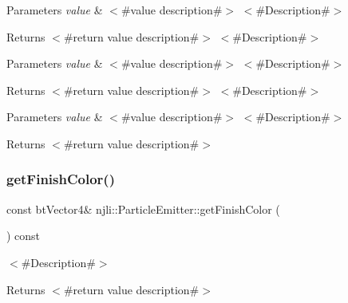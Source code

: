 \begin{DoxyParams}{Parameters}
{\em value} & $<$\#value description\#$>$ $<$\#\+Description\#$>$\\
\hline
\end{DoxyParams}
\begin{DoxyReturn}{Returns}
$<$\#return value description\#$>$ $<$\#\+Description\#$>$
\end{DoxyReturn}

\begin{DoxyParams}{Parameters}
{\em value} & $<$\#value description\#$>$ $<$\#\+Description\#$>$\\
\hline
\end{DoxyParams}
\begin{DoxyReturn}{Returns}
$<$\#return value description\#$>$ $<$\#\+Description\#$>$
\end{DoxyReturn}

\begin{DoxyParams}{Parameters}
{\em value} & $<$\#value description\#$>$ $<$\#\+Description\#$>$\\
\hline
\end{DoxyParams}
\begin{DoxyReturn}{Returns}
$<$\#return value description\#$>$ 
\end{DoxyReturn}
\mbox{\label{classnjli_1_1_particle_emitter_a55307cfc00ce9545693c28c036182d5f}} 
\subsubsection{\texorpdfstring{get\+Finish\+Color()}{getFinishColor()}}
{\footnotesize\ttfamily const bt\+Vector4\& njli\+::\+Particle\+Emitter\+::get\+Finish\+Color (\begin{DoxyParamCaption}{ }\end{DoxyParamCaption}) const}

$<$\#\+Description\#$>$

\begin{DoxyReturn}{Returns}
$<$\#return value description\#$>$ 
\end{DoxyReturn}
\mbox{\label{classnjli_1_1_particle_emitter_a3418034b822a39c71cf4e315117bcea5}} 

